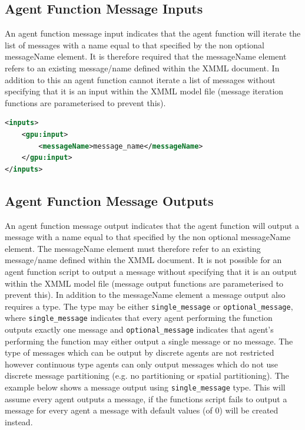 \documentclass[11pt, a4paper, onecolumn, oneside]{report}
\begin{document}
\subsection{Agent Function Message Inputs}
\label{sec:251}


An agent function message input indicates that the agent function will iterate the list of messages with a name equal to that specified by the non optional messageName element.
It is therefore required that the messageName element refers to an existing message/name defined within the XMML document.
In addition to this an agent function cannot iterate a list of messages without specifying that it is an input within the XMML model file (message iteration functions are parameterised to prevent this).

\begin{lstlisting}[language=XML]
<inputs>
    <gpu:input>
        <messageName>message_name</messageName>
    </gpu:input>
</inputs>
\end{lstlisting}

\subsection{Agent Function Message Outputs}
\label{sec:252}

An agent function message output indicates that the agent function will output a message with a name equal to that specified by the non optional messageName element.
The messageName element must therefore refer to an existing message/name defined within the XMML document.
It is not possible for an agent function script to output a message without specifying that it is an output within the XMML model file (message output functions are parameterised to prevent this).
In addition to the messageName element a message output also requires a type.
The type may be either \texttt{single_message} or \texttt{optional_message}, where \texttt{single_message} indicates that every agent performing the function outputs exactly one message and \texttt{optional_message} indicates that agent's performing the function may either output a single message or no message.
The type of messages which can be output by discrete agents are not restricted however continuous type agents can only output messages which do not use discrete message partitioning (e.g.
no partitioning or spatial partitioning).
The example below shows a message output using \texttt{single_message} type.
This will assume every agent outputs a message, if the functions script fails to output a message for every agent a message with default values (of $0$) will be created instead.
\end{document}
